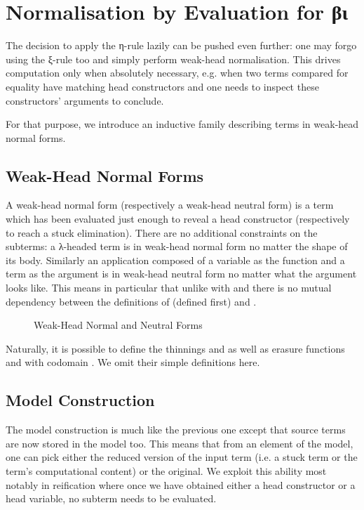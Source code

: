 
\section{Normalisation by Evaluation for βι}

The decision to apply the η-rule lazily can be pushed even further: one may
forgo using the ξ-rule too and simply perform weak-head normalisation. This
drives computation only when absolutely necessary, e.g.
when two terms compared for equality have matching head constructors
and one needs to inspect these constructors' arguments to conclude.

For that purpose, we introduce an inductive family describing terms in weak-head
normal forms.

\subsection{Weak-Head Normal Forms}

A weak-head normal form (respectively a weak-head neutral form) is a term which has
been evaluated just enough to reveal a head constructor (respectively to reach a
stuck elimination). There are no additional constraints on the subterms: a λ-headed
term is in weak-head normal form no matter the shape of its body. Similarly an
application composed of a variable as the function and a term as the argument is in
weak-head neutral form no matter what the argument looks like. This means in particular
that unlike with  and  there is no mutual dependency between the definitions
of  (defined first) and .

\begin{figure}[h]
\caption{Weak-Head Normal and Neutral Forms\label{fig:weakhead}}
\end{figure}

Naturally, it is possible to define the thinnings
 and  as well as erasure
functions  and 
with codomain . We omit their simple definitions here.

\subsection{Model Construction}

The model construction is much like the previous one except
that source terms are now stored in the model too. This means that
from an element of the model, one can pick either the reduced version
of the input term (i.e. a stuck term or the term's computational
content) or the original. We exploit this ability most
notably in reification where once we have obtained either a
head constructor or a head variable, no subterm needs to
be evaluated.


